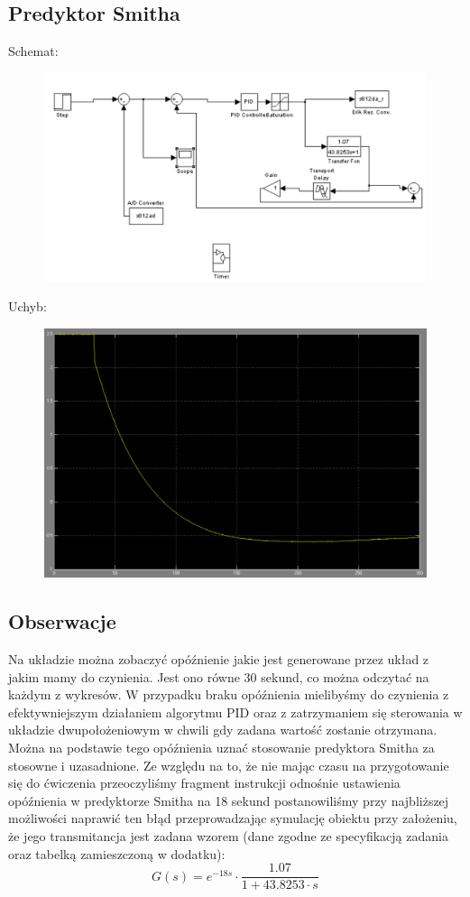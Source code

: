 \documentclass[a4paper]{article}
\begin{document}
		\subsection{Predyktor Smitha}
			Schemat:
			\begin{figure}[H]
				\centering
				\includegraphics[width=\textwidth]{./img/smith_algo.png}
			\end{figure}
			\newpage
			Uchyb:
			\begin{figure}[H]
				\centering
				\includegraphics[width=\textwidth]{./img/smith_error.png}
			\end{figure}
		\subsection{Obserwacje}
			Na układzie można zobaczyć opóźnienie jakie jest generowane przez układ z jakim mamy do czynienia. Jest ono równe 30 sekund, co można odczytać na każdym z wykresów. W przypadku braku opóźnienia mielibyśmy do czynienia z efektywniejszym działaniem algorytmu PID oraz z zatrzymaniem się sterowania w układzie dwupołożeniowym w chwili gdy zadana wartość zostanie otrzymana. Można na podstawie tego opóźnienia uznać stosowanie predyktora Smitha za stosowne i uzasadnione. Ze względu na to, że nie mając czasu na przygotowanie się do ćwiczenia przeoczyliśmy fragment instrukcji odnośnie ustawienia opóźnienia w predyktorze Smitha na 18 sekund postanowiliśmy przy najbliższej możliwości naprawić ten błąd przeprowadzając symulację obiektu przy założeniu, że jego transmitancja jest zadana wzorem (dane zgodne ze specyfikacją zadania oraz tabelką zamieszczoną w dodatku):
			$$
				G(s) = e^{-18s} \cdot \frac{1.07}{1+43.8253\cdot s}
			$$
\end{document}
